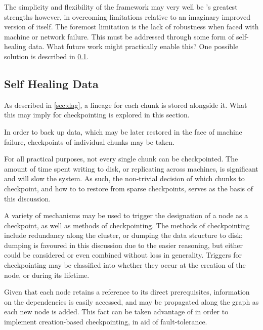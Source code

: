 The simplicity and flexibility of the framework may very well be \lsr{}'s greatest strengths however, in overcoming limitations relative to an imaginary improved version of itself.
The foremost limitation is the lack of robustness when faced with machine or network failure.
This must be addressed through some form of self-healing data.
What future work might practically enable this?
One possible solution is described in \cref{sec:self-heal}.

\subsection{Self Healing Data}\label{sec:self-heal}

As described in \cref{sec:dag}, a lineage for each chunk is stored alongside it.
What this may imply for checkpointing is explored in this section.

In order to back up data, which may be later restored in the face of machine failure, checkpoints of individual chunks may be taken\cite{elnozahy2002recovery}.

For all practical purposes, not every single chunk can be checkpointed.
The amount of time spent writing to disk, or replicating across machines, is significant and will slow the system.
As such, the non-trivial decision of which chunks to checkpoint, and how to to restore from sparse checkpoints, serves as the basis of this discussion.

A variety of mechanisms may be used to trigger the designation of a node as a checkpoint, as well as methods of checkpointing.
The methods of checkpointing include redundancy along the cluster, or dumping the data structure to disk; dumping is favoured in this discussion due to the easier reasoning, but either could be considered or even combined without loss in generality\cite{walters2009replication}.
Triggers for checkpointing may be classified into whether they occur at the creation of the node, or during its lifetime.

Given that each node retains a reference to its direct prerequisites, information on the dependencies is easily accessed, and may be propagated along the graph as each new node is added.
This fact can be taken advantage of in order to implement creation-based checkpointing, in aid of fault-tolerance.

